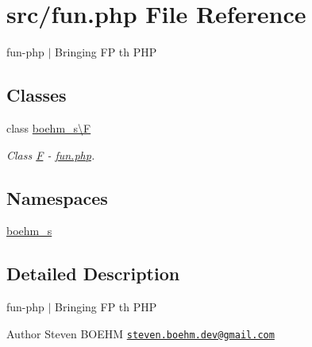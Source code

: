 \hypertarget{fun_8php}{}\section{src/fun.php File Reference}
\label{fun_8php}


fun-\/php $\vert$ Bringing FP th P\+HP  


\subsection*{Classes}
\begin{DoxyCompactItemize}
\item 
class \hyperlink{classboehm__s_1_1F}{boehm\+\_\+s\textbackslash{}F}
\begin{DoxyCompactList}\small\item\em Class \hyperlink{classboehm__s_1_1F}{F} -\/ \hyperlink{fun_8php}{fun.\+php}. \end{DoxyCompactList}\end{DoxyCompactItemize}
\subsection*{Namespaces}
\begin{DoxyCompactItemize}
\item 
 \hyperlink{namespaceboehm__s}{boehm\+\_\+s}
\end{DoxyCompactItemize}


\subsection{Detailed Description}
fun-\/php $\vert$ Bringing FP th P\+HP 

\begin{DoxyAuthor}{Author}
Steven B\+O\+E\+HM \href{mailto:steven.boehm.dev@gmail.com}{\tt steven.\+boehm.\+dev@gmail.\+com} 
\end{DoxyAuthor}
